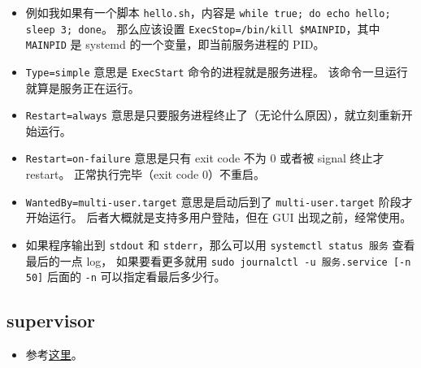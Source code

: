 \begin{itemize}
\item 例如我如果有一个脚本 \verb`hello.sh`，内容是 \verb`while true; do echo hello; sleep 3; done`。 那么应该设置 \verb`ExecStop=/bin/kill $MAINPID`，其中 \verb`MAINPID` 是 systemd 的一个变量，即当前服务进程的 PID。
\item \verb`Type=simple` 意思是 \verb`ExecStart` 命令的进程就是服务进程。 该命令一旦运行就算是服务正在运行。
\item \verb`Restart=always` 意思是只要服务进程终止了（无论什么原因），就立刻重新开始运行。
\item \verb`Restart=on-failure` 意思是只有 exit code 不为 0 或者被 signal 终止才 restart。 正常执行完毕（exit code 0）不重启。
\item \verb`WantedBy=multi-user.target` 意思是启动后到了 \verb`multi-user.target` 阶段才开始运行。 后者大概就是支持多用户登陆，但在 GUI 出现之前，经常使用。
\item 如果程序输出到 \verb`stdout` 和 \verb`stderr`，那么可以用 \verb`systemctl status 服务` 查看最后的一点 log， 如果要看更多就用 \verb`sudo journalctl -u 服务.service [-n 50]` 后面的 \verb`-n` 可以指定看最后多少行。
\end{itemize}

\subsection{supervisor}
\begin{itemize}
\item 参考\href{https://www.digitalocean.com/community/tutorials/how-to-install-and-manage-supervisor-on-ubuntu-and-debian-vps}{这里}。
\end{itemize}
